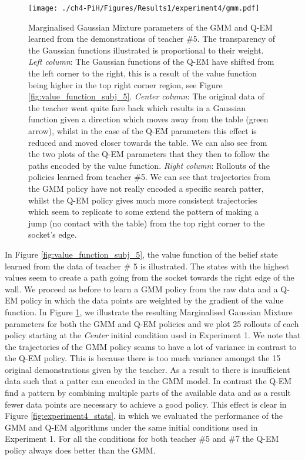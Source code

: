  \begin{figure}
    \centering
    \texttt{[image: ./ch4-PiH/Figures/Results1/experiment4/gmm.pdf]}
    \caption{Marginalised Gaussian Mixture parameters of the GMM and Q-EM learned from the demonstrations of teacher \#5. 
    The transparency of the Gaussian functions illustrated is proportional to their weight.
    \textit{Left column}: The Gaussian functions of the Q-EM have shifted from the left corner to the right, this is a result of the value function 
    being higher in the top right corner region, see Figure \ref{fig:value_function_subj_5}. \textit{Center column}:  The original data of the teacher 
    went quite fare back which results in a Gaussian function given a direction which moves away from the table (green arrow), whilst in the case
    of the Q-EM parameters this effect is reduced and moved closer towards the table.  We can also see from the two plots of the Q-EM parameters 
    that they then to follow the paths encoded by the value function.    
    \textit{Right column}: Rollouts of the policies learned from teacher \#5. We can see that trajectories from the GMM policy have not really 
    encoded a specific search patter, whilst the Q-EM policy gives much more consistent trajectories which seem to replicate to some extend 
    the pattern of making a jump (no contact with the table) from the top right corner to the socket's edge.}
    \label{fig:gmm_exp4}
\end{figure}
 
In Figure \ref{fig:value_function_subj_5}, the value function of the belief state learned from the data of teacher \# 5 is 
illustrated. The states with the highest values seem to create a path going from the socket towards the right edge of the wall. 
We proceed as before to learn a GMM policy from the raw data and a Q-EM policy in which the data points are weighted by 
the gradient of the value function. In Figure \ref{fig:gmm_exp4}, we illustrate the 
resulting Marginalised Gaussian Mixture parameters for both the GMM and Q-EM policies and we plot 25 rollouts of each policy starting at 
the \textit{Center} initial condition used in Experiment 1. We note that the trajectories of the GMM 
policy seams to have a lot of variance in contrast to the Q-EM policy. This is because there is too much variance amongst the 15 original demonstrations
given by the teacher. As a result to there is insufficient data such that a patter can encoded in the GMM model. In contrast the Q-EM find a 
pattern by combining multiple parts of the available data and as a result fewer data points are necessary to achieve a good policy. 
This effect is clear in Figure \ref{fig:experiment4_stats}, in which we evaluated the performance of the GMM and Q-EM algorithms 
under the same initial conditions used in Experiment 1. For all the conditions for both teacher \#5 and \#7 the Q-EM policy 
always does better than the GMM.

